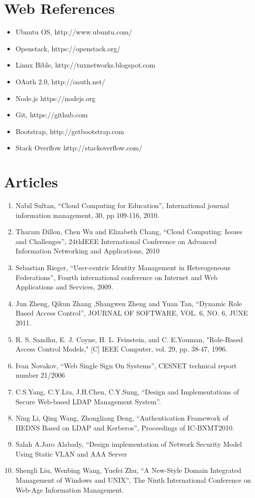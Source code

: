 \documentclass[12pt]{report}
\begin{document}
\section{Web References}

\begin{itemize}
\item Ubnutu OS, http://www.ubuntu.com/
\item Openstack, https://openstack.org/
\item Linux Bible, http://tuxnetworks.blogspot.com
\item OAuth 2.0, http://oauth.net/
\item Node.js https://nodejs.org
\item Git, https://github.com
\item Bootstrap, http://getbootstrap.com 
\item Stack Overflow http://stackoverflow.com/

\end{itemize}
		
\section{Articles}

\begin{enumerate}
\item Nabil Sultan, ``Cloud Computing for Education”, International journal information management, 30, pp 109-116, 2010.
\item Tharam Dillon, Chen Wu and Elizabeth Chang, ``Cloud Computing: Issues and Challenges'',  24thIEEE International Conference on Advanced Information Networking and Applications, 2010 
\item Sebastian Rieger, ``User-centric Identity Management in Heterogeneous Federations'', Fourth international conference on Internet and Web Applications and Services, 2009.
\item Jun Zheng, Qikun Zhang ,Shangwen Zheng and Yuan Tan, ``Dynamic Role Based Access Control'',  JOURNAL OF SOFTWARE, VOL. 6, NO. 6, JUNE 2011.
\item R. S. Sandhu, E. J. Coyne, H. L. Feinstein, and C. E.Youman, "Role-Based Access Control Models," [C] IEEE Computer, vol. 29, pp. 38-47, 1996.
\item Ivan Novakov, ``Web Single Sign On Systems'', CESNET technical report number 21/2006
\item C.S.Yang, C.Y.Liu, J.H.Chen, C.Y.Sung, ``Design and Implementations of Secure Web-based LDAP Management System''.
\item Ning Li, Qing Wang, Zhongliang Deng, ``Authentication Framework of IIEDNS Based on LDAP and Kerberos'', Proceedings of IC-BNMT2010.
\item Salah A.Jaro Alabady, ``Design implementation of Network Security Model Using Static VLAN and AAA Server
\item Shengli Liu, Wenbing Wang, Yuefei Zhu, ``A New-Style Domain Integrated Management of Windows and UNIX'', The Ninth International Conference on Web-Age Information Management.
\end{enumerate}
\end{document}
